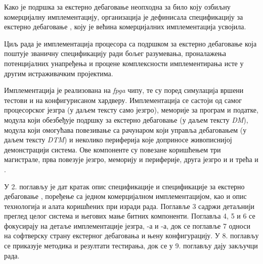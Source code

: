 Како је подршка за екстерно дебаговање неопходна за било коју озбиљну комерцијалну имплементацију,  организација је дефинисала спецификацију за екстерно дебаговање \cite{debug_spec}, коју је већина комерцијалних имплементација усвојила. \newpage

Циљ рада је имплементација  процесора са подршком за екстерно дебаговање која поштује званичну спецификацију \cite{debug_spec} ради бољег разумевања, проналажења потенцијалних унапређења и процене комплексности имплементирања исте у другим истраживачким пројектима.

Имплементација је реализована на \textit{\acrfull{fpga}} чипу, те су поред симулација вршени тестови и на конфигурисаном хардверу.
Имплементација се састоји од самог  процесорског језгра (у даљем тексту само језгро), меморије за програм и податке, модула који обезбеђује подршку за екстерно дебаговање (у даљем тексту \textit{\acrfull{DM}}), модула који омогућава повезивање са рачунаром који управља дебаговањем (у даљем тексту \textit{\acrfull{DTM}}) и неколико периферија које доприносе живописнијој демонстрацији система. Ове компоненте су повезане коришћењем три магистрале, прва повезује језгро, меморију и периферије, друга језгро и  и трећа  и .

У 2. поглављу је дат кратак опис  спецификације \cite{riscv_spec} и спецификације за екстерно дебаговање \cite{debug_spec}, поређење са једном комерцијалном имплементацијом, као и опис технологија и алата коришћених при изради рада.
Поглавље 3 садржи детаљнији преглед целог система и његових мање битних компоненти.
Поглавља 4, 5 и 6 се фокусирају на детаље имплементације језгра, -а и -а, док се поглавље 7 односи на софтверску страну екстерног дебаговања и њену конфигурацију. У 8. поглављу се приказује методика и резултати тестирања, док се у 9. поглављу дају закључци рада.
